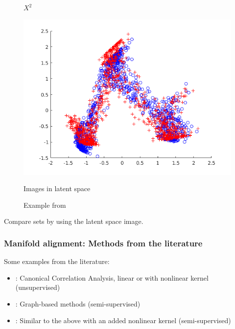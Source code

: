 \documentclass{beamer}
\begin{document}
\begin{frame}
\begin{figure}
\begin{minipage}[b]{0.32\linewidth}
      \caption{$X^2$}
    \end{minipage}
    \hfill
    \begin{minipage}[b]{0.32\linewidth}
      \includegraphics[width=\textwidth]{./Images/KEMA_Example/result.png}
      \caption{Images in latent space}
    \end{minipage}
    \caption{Example from \cite{Tuia2016}}
  \end{figure}
  Compare sets by using the latent space image.
\end{frame}


\begin{frame}
  \frametitle{Manifold alignment: Methods from the literature}
  Some examples from the literature:
  \begin{itemize}
  \item \cite{Yeh2014}: Canonical Correlation Analysis, linear or with nonlinear kernel (unsupervised)
  \item \cite{Wang2013}: Graph-based methods (semi-supervised)
  \item \cite{Tuia2016}: Similar to the above with an added nonlinear kernel (semi-supervised)
  \end{itemize}
\end{frame}

\end{document}
